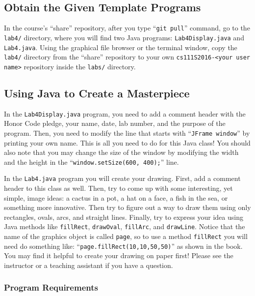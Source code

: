 \vspace{-0.05in}
\subsection*{Obtain the Given Template Programs}
\vspace{-0.05in}

In the course's ``share'' repository, after you type ``{\tt git pull}'' command, go to the {\tt lab4/} directory, where
you will find two Java programs: {\tt Lab4Display.java} and {\tt Lab4.java}. Using the graphical file browser or the
terminal window, copy the {\tt lab4/} directory from the ``share'' repository to your own {\tt cs111S2016-<your user
name>} repository inside the {\tt labs/} directory.

\subsection*{Using Java to Create a Masterpiece}

In the {\tt Lab4Display.java} program, you need to add a comment header with the Honor Code pledge, your name, date, lab
number, and the purpose of the program. Then, you need to modify the line that starts with ``{\tt JFrame window}'' by
printing your own name. This is all you need to do for this Java class! You should also note that you may change the size of
the window by modifying the width and the height in the ``{\tt window.setSize(600, 400);}'' line.

In the {\tt Lab4.java} program you will create your drawing. First, add a comment header to this class as well.  Then,
try to come up with some interesting, yet simple, image ideas: a cactus in a pot, a hat on a face, a fish in the sea, or
something more innovative.  Then try to figure out a way to draw them using only rectangles, ovals, arcs, and straight
lines.  Finally, try to express your idea using Java methods like {\tt fillRect}, {\tt drawOval}, {\tt fillArc}, and
{\tt drawLine}. Notice that the name of the graphics object is called {\tt page}, so to use a method {\tt fillRect} you
will need do something like: ``{\tt page.fillRect(10,10,50,50)}'' as shown in the book.  You may find it helpful to create
your drawing on paper first! Please see the instructor or a teaching assistant if you have a question.

\vspace*{-.1in}
\subsubsection*{Program Requirements}


